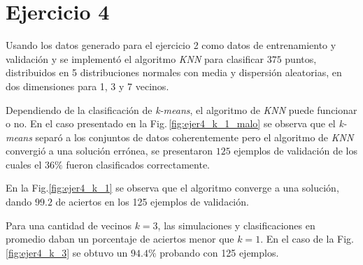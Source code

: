     \section*{Ejercicio 4}

    Usando los datos generado para el ejercicio  2 como datos de entrenamiento  y  validación y se implementó el algoritmo \emph{KNN} para clasificar $375$ puntos,   distribuidos en  5 distribuciones normales  con media y dispersión aleatorias, en dos dimensiones para 1, 3 y 7 vecinos. 


    Dependiendo de la clasificación de \emph{k-means}, el algoritmo de \emph{KNN} puede funcionar o no. En el caso presentado en la Fig.\,\ref{fig:ejer4_k_1_malo} se observa que el \emph{k-means} separó a los conjuntos de datos coherentemente pero el algoritmo de \emph{KNN} convergió a  una solución errónea, se presentaron $125$ ejemplos de validación de los cuales el $36\%$ fueron clasificados correctamente.


    En la Fig.\ref{fig:ejer4_k_1} se observa que el algoritmo converge a una solución, dando $99.2$ de aciertos en los 125 ejemplos de validación.


    Para una cantidad de vecinos $k=3$, las  simulaciones y clasificaciones en promedio daban un porcentaje de aciertos menor que $k=1$. En el caso de la Fig.\,\ref{fig:ejer4_k_3} se obtuvo un $94.4\%$ probando con 125 ejemplos. 


